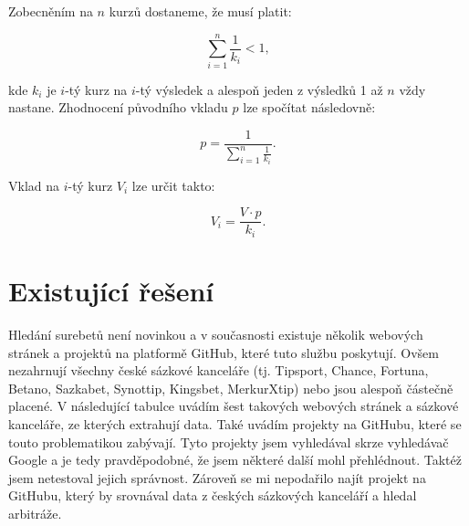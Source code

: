 \documentclass[11pt,a4paper,twoside,openright]{report}
\begin{document}
Zobecněním na $n$ kurzů dostaneme, že musí platit:

\begin{equation}
    \sum_{i=1}^n \frac{1}{k_i} < 1,
\end{equation}

kde $k_i$ je $i$-tý kurz na $i$-tý výsledek a alespoň jeden z výsledků 1 až $n$ vždy nastane. Zhodnocení původního vkladu $p$ lze spočítat následovně:

\begin{equation}
    p = \frac{1}{\sum_{i=1}^n \frac{1}{k_i}}.
\end{equation}

Vklad na $i$-tý kurz $V_i$ lze určit takto:

\begin{equation}
    V_i = \frac{V \cdot p}{k_i}.
\end{equation}


\section{Existující řešení}

Hledání surebetů není novinkou a v současnosti existuje několik webových stránek a projektů na platformě GitHub, které tuto službu poskytují. Ovšem nezahrnují všechny české sázkové kanceláře (tj. Tipsport, Chance, Fortuna, Betano, Sazkabet, Synottip, Kingsbet, MerkurXtip) nebo jsou alespoň částečně placené. V následující tabulce uvádím šest takových webových stránek a sázkové kanceláře, ze kterých extrahují data. Také uvádím projekty na GitHubu, které se touto problematikou zabývají. Tyto projekty jsem vyhledával skrze vyhledávač Google a je tedy pravděpodobné, že jsem některé další mohl přehlédnout. Taktéž jsem netestoval jejich správnost. Zároveň se mi nepodařilo najít projekt na GitHubu, který by srovnával data z českých sázkových kanceláří a hledal arbitráže.
\end{document}
